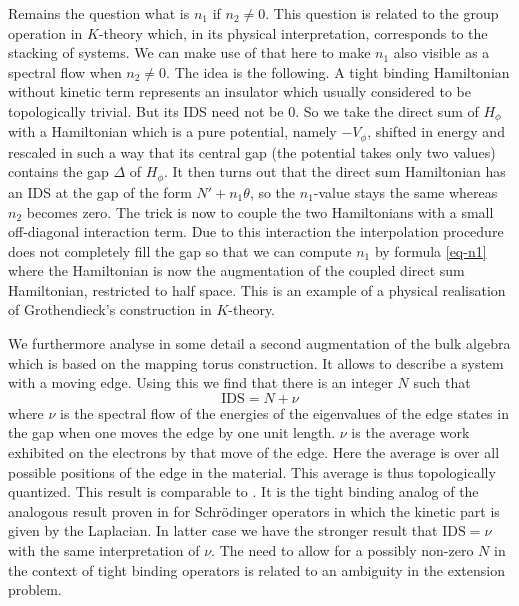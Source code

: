 \documentclass[11pt]{amsart}
\begin{document}
Remains the question what is $n_1$ if $n_2\neq 0$. This question is related to the group operation in $K$-theory which, in its physical interpretation, corresponds to the stacking of systems. We can make use of that here to make $n_1$ also visible as a spectral flow when $n_2\neq 0$. The idea is the following. A tight binding Hamiltonian without kinetic term represents an insulator which usually considered to be topologically trivial. But its IDS need not be $0$. So we take the direct sum of $H_\phi$ with a Hamiltonian which is a pure potential, namely $-V_\phi$, shifted in energy and rescaled in such a way that its central gap (the potential takes only two values) contains the gap $\Delta$ of $H_\phi$. It then turns out  that the direct sum Hamiltonian has an IDS at the gap of the form $N'+n_1\theta$, so the $n_1$-value stays the same whereas $n_2$ becomes zero. The trick is now to couple the two Hamiltonians with a small off-diagonal interaction term. Due to this interaction the interpolation procedure does not completely fill the gap so that we can compute $n_1$ by formula \eqref{eq-n1} where the Hamiltonian is now the augmentation of the coupled direct sum Hamiltonian, restricted to half space. This is an example of a physical realisation of Grothendieck's construction in $K$-theory.

We furthermore analyse in some detail a second augmentation of the bulk algebra which is based on the mapping torus construction. It allows to describe a system with a moving edge. Using this we find that there is an integer $N$ such that 
\begin{equation}\label{eq-IDS-shift}
	\mathrm{IDS} = N + \nu
\end{equation}
where $\nu$ is the spectral flow of the energies of the eigenvalues of the edge states in the gap when one moves the edge by one unit length. $\nu$ is the average work exhibited on the electrons by that move of the edge. Here the average is over all possible positions of the edge in the material. This average is thus topologically quantized.  
This result is comparable to \cite{dana1985quantised,kunz1986quantized}. 
It is the tight binding analog of the analogous result proven in \cite{ZoisKellendonk2005rotation} for Schr\"odinger operators in which the kinetic part is given by the Laplacian. In latter case we have the stronger result that $\mathrm{IDS} = \nu$ with the same interpretation of $\nu$. The need to allow for a possibly non-zero $N$ in the context of tight binding operators is related to an ambiguity in the extension problem. 
\end{document}
